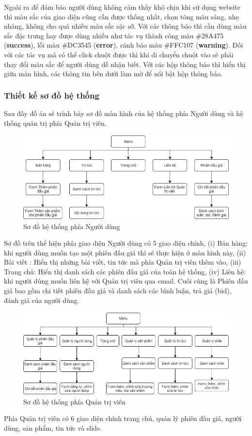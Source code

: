 \documentclass[../DoAn.tex]{subfiles}
\begin{document}
Ngoài ra để đảm bảo người dùng không cảm thấy khó chịu khi sử dụng website thì màu sắc của giao diện cũng cần được thống nhất, chọn tông màu sáng, nhẹ nhàng, không cho quá nhiều màu sắc sặc sỡ. Với các thông báo thì cần dùng màu sắc đặc trưng hay được dùng nhiều như tác vụ thành công màu \#28A475 (\textbf{success}), lỗi màu \#DC3545 (\textbf{error}), cảnh báo màu \#FFC107 (\textbf{warning}). Đối với các tác vụ mà có thể click chuột được thì khi di chuyển chuột vào sẽ phải thay đổi màu sắc để người dùng dễ nhận biết. Với các hộp thông báo thì hiển thị giữa màn hình, các thông tin bên dưới làm mờ để nổi bật hộp thông báo.
\subsubsection{Thiết kế sơ đồ hệ thống}
Sau đây đồ án sẽ trình bày sơ đồ màn hình của hệ thống phía Người dùng và hệ thống quản trị phía Quản trị viên.
\begin{figure}[H]
    \centering
    \includegraphics[width=0.75\linewidth,height=4.65cm]{Hinhve/clientpage.png}
    \caption{Sơ đồ hệ thống phía Người dùng}
    \label{fig:Fig46}
\end{figure}
Sơ đồ trên thể hiện phía giao diện Người dùng có 5 giao diện chính, (i) Bán hàng: khi người dùng muốn tạo một phiên đấu giá thì sẽ thực hiện ở màn hình này, (ii) Bài viết : Hiển thị những bài viết, tin tức mà phía Quản trị viên thêm vào, (iii) Trang chủ:  Hiển thị danh sách các phiên đấu giá của toàn hệ thống, (iv) Liên hệ: khi người dùng muốn liên hệ với Quản trị viên qua email. Cuối cùng là Phiên đấu giá bao gồm chi tiết phiên đấu giá và danh sách các bình luận, trả giá (bid), đánh giá của người dùng.
\begin{figure}[H]
    \centering
    \includegraphics[width=0.75\linewidth,height=4.54cm]{Hinhve/adminpage.png}
    \caption{Sơ đồ hệ thống phía Quản trị viên}
    \label{fig:Fig47}
\end{figure}
Phía Quản trị viên có 6 giao diện chính trang chủ, quản lý phiên đấu giá, người dùng, sản phẩm, tin tức và slide.
\newpage
\end{document}

